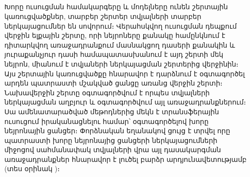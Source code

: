\documentclass[12pt]{article}
\begin{document}
\begin{center}
\subsection*{
 } 
 \end{center}
 \noindent
{}
{}

Խորը ուսուցման համակարգերը և մոդելները ունեն շերտային կառուցվածքներ, տարբեր շերտեր տվյալների տարբեր ներկայացումներ են սովորում։ Վերահսկվող ուսուցման դեպքում վերջին ելքային շերտը, որի նեյրոները քանակը համընկնում  է  դիտարկվող առաջադրանքում մասնակցող դասերի քանակին և յուրաքանչյուր դասի համապատասխանում է այդ շերտի մեկ նեյրոն,   միանում է տվյաների ներկայացման շերտերից վերջինին։ Այս շերտային կառուցվածքը հնարավոր է դարձնում է օգտագործել արդեն պատրաստի մշակված ցանցը առանց վերջին շերտի։ Նախավերջին շերտը օգտագործվում է որպես տվյալների ներկայացման աղբյուր և օգտագործվում այլ առաջադրանքներում։  Սա ամենատարածված մեթոդներից մեկն է տրանսֆերային ուսուցում իրականացնելու համար՝ օգտագործելով խորը նեյրոնային ցանցեր։ Փորձնական եղանակով ցույց է տրվել որը պատրաստի խորը նեյրոնայից ցանցերի ներկայացումների միջոցով սահմանափակ տվյալների վրա այլ դասակարգման առաջադրանքներ հնարավոր է լուծել բարձր արդյունավետությամբ (տես օրինակ \cite{bib_item_8})։ \\
\end{document}
